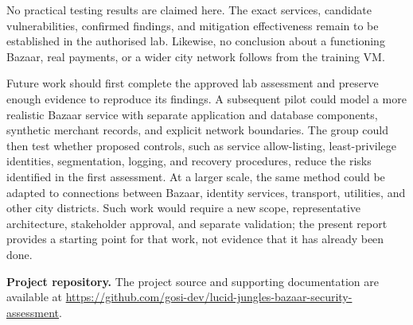 \documentclass[11pt,a4paper]{article}
\begin{document}
No practical testing results are claimed here. The exact services, candidate vulnerabilities, confirmed findings, and mitigation effectiveness remain to be established in the authorised lab. Likewise, no conclusion about a functioning Bazaar, real payments, or a wider city network follows from the training VM.

Future work should first complete the approved lab assessment and preserve enough evidence to reproduce its findings. A subsequent pilot could model a more realistic Bazaar service with separate application and database components, synthetic merchant records, and explicit network boundaries. The group could then test whether proposed controls, such as service allow-listing, least-privilege identities, segmentation, logging, and recovery procedures, reduce the risks identified in the first assessment. At a larger scale, the same method could be adapted to connections between Bazaar, identity services, transport, utilities, and other city districts. Such work would require a new scope, representative architecture, stakeholder approval, and separate validation; the present report provides a starting point for that work, not evidence that it has already been done.

\clearpage



\par\medskip
\noindent\textbf{Project repository.} The project source and supporting documentation are available at \url{https://github.com/gosi-dev/lucid-jungles-bazaar-security-assessment}.
\end{document}
